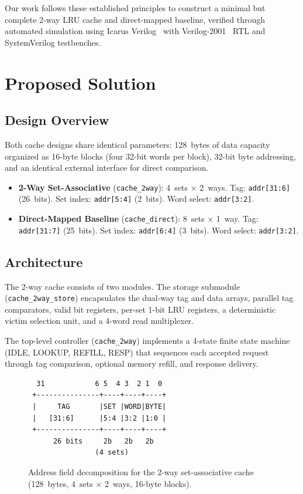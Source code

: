 \documentclass[conference]{IEEEtran}
\begin{document}
Our work follows these established principles to construct a minimal but
complete 2-way LRU cache and direct-mapped baseline, verified through
automated simulation using Icarus Verilog~\cite{icarus-verilog} with
Verilog-2001~\cite{ieee-verilog2001} RTL and SystemVerilog testbenches.

\section{Proposed Solution}

\subsection{Design Overview}

Both cache designs share identical parameters: 128~bytes of data capacity
organized as 16-byte blocks (four 32-bit words per block), 32-bit byte
addressing, and an identical external interface for direct comparison.

\begin{itemize}
  \item \textbf{2-Way Set-Associative} (\texttt{cache\_2way}): 4~sets $\times$ 2~ways.  Tag: \texttt{addr[31:6]} (26~bits).  Set index: \texttt{addr[5:4]} (2~bits).  Word select: \texttt{addr[3:2]}.
  \item \textbf{Direct-Mapped Baseline} (\texttt{cache\_direct}): 8~sets $\times$ 1~way.  Tag: \texttt{addr[31:7]} (25~bits).  Set index: \texttt{addr[6:4]} (3~bits).  Word select: \texttt{addr[3:2]}.
\end{itemize}

\subsection{Architecture}

The 2-way cache consists of two modules.  The storage submodule
(\texttt{cache\_2way\_store}) encapsulates the dual-way tag and data
arrays, parallel tag comparators, valid bit registers, per-set 1-bit
LRU registers, a deterministic victim selection unit, and a 4-word read
multiplexer.

The top-level controller (\texttt{cache\_2way}) implements a 4-state
finite state machine (IDLE, LOOKUP, REFILL, RESP) that sequences each
accepted request through tag comparison, optional memory refill, and
response delivery.

\begin{figure}[ht]
\centering
\small
\begin{verbatim}
  31            6 5  4 3  2 1  0
 +---------------+----+----+----+
 |     TAG       |SET |WORD|BYTE|
 |   [31:6]      |5:4 |3:2 |1:0 |
 +---------------+----+----+----+
      26 bits     2b   2b   2b
                (4 sets)
\end{verbatim}
\caption{Address field decomposition for the 2-way set-associative cache (128~bytes, 4~sets $\times$ 2~ways, 16-byte blocks).}
\label{fig:addr-fields}
\end{figure}
\end{document}
